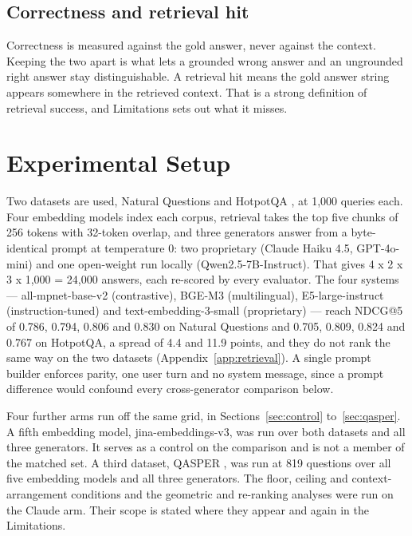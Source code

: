 \documentclass[11pt]{article}
\begin{document}
\subsection{Correctness and retrieval hit}
\label{sec:def-correct}

Correctness is measured against the gold answer, never against the context. Keeping the two apart is what lets a grounded wrong answer and an ungrounded right answer stay distinguishable. A retrieval hit means the gold answer string appears somewhere in the retrieved context. That is a strong definition of retrieval success, and Limitations sets out what it misses.


\section{Experimental Setup}
\label{sec:setup}

Two datasets are used, Natural Questions \citep{kwiatkowski-etal-2019} and HotpotQA \citep{yang-etal-2018}, at 1,000 queries each. Four embedding models index each corpus, retrieval takes the top five chunks of 256 tokens with 32-token overlap, and three generators answer from a byte-identical prompt at temperature 0: two proprietary (Claude Haiku 4.5, GPT-4o-mini) and one open-weight run locally (Qwen2.5-7B-Instruct). That gives 4 x 2 x 3 x 1,000 = 24,000 answers, each re-scored by every evaluator. The four systems --- all-mpnet-base-v2 (contrastive), BGE-M3 (multilingual), E5-large-instruct (instruction-tuned) and text-embedding-3-small (proprietary) --- reach NDCG@5 of 0.786, 0.794, 0.806 and 0.830 on Natural Questions and 0.705, 0.809, 0.824 and 0.767 on HotpotQA, a spread of 4.4 and 11.9 points, and they do not rank the same way on the two datasets (Appendix~\ref{app:retrieval}). A single prompt builder enforces parity, one user turn and no system message, since a prompt difference would confound every cross-generator comparison below.

Four further arms run off the same grid, in Sections~\ref{sec:control} to~\ref{sec:qasper}. A fifth embedding model, jina-embeddings-v3, was run over both datasets and all three generators. It serves as a control on the comparison and is not a member of the matched set. A third dataset, QASPER \citep{dasigi-etal-2021}, was run at 819 questions over all five embedding models and all three generators. The floor, ceiling and context-arrangement conditions and the geometric and re-ranking analyses were run on the Claude arm. Their scope is stated where they appear and again in the Limitations.
\end{document}
